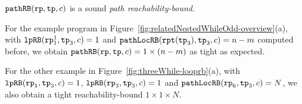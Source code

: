 $\mathtt{pathRB}(\mathtt{rp}, \mathtt{tp}, c)$ is a sound \emph{path reachability-bound}.
%

For the example program in Figure~\ref{fig:relatedNestedWhileOdd-overview}(a),
with $\mathtt{lpRB}(\mathtt{rp}_1^1, \mathtt{tp}_3, c) = 1$ and
$\mathtt{pathLocRB}(\mathtt{rpt}(\mathtt{tp}_3), \mathtt{tp}_3, c) = n - m$ computed before,
we obtain $\mathtt{pathRB}(\mathtt{rp}, \mathtt{tp}, c) = 1 \times (n - m)$ as tight as expected.

For the other example in Figure~\ref{fig:threeWhile-looprb}(a), with $\mathtt{lpRB}(\mathtt{rp}_1, \mathtt{tp}_3, c) = 1$,
$\mathtt{lpRB}(\mathtt{rp}_3, \mathtt{tp}_3, c) = 1$ and
$\mathtt{pathLocRB}(\mathtt{rp}_6, \mathtt{tp}_3, c) = N$,
we also obtain a tight reachability-bound $1 \times 1 \times N$.

